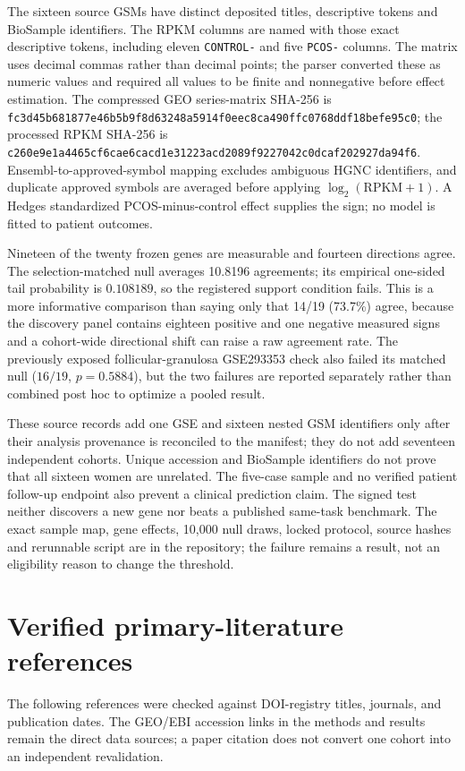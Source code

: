 \documentclass[11pt,a4paper]{article}
\begin{document}
The sixteen source GSMs have distinct deposited titles, descriptive tokens and BioSample identifiers. The RPKM columns are named with those exact descriptive tokens, including eleven \texttt{CONTROL-} and five \texttt{PCOS-} columns. The matrix uses decimal commas rather than decimal points; the parser converted these as numeric values and required all values to be finite and nonnegative before effect estimation. The compressed GEO series-matrix SHA-256 is \texttt{fc3d45b681877e46b5b9f8d63248a5914f0eec8ca490ffc0768ddf18befe95c0}; the processed RPKM SHA-256 is \texttt{c260e9e1a4465cf6cae6cacd1e31223acd2089f9227042c0dcaf202927da94f6}. Ensembl-to-approved-symbol mapping excludes ambiguous HGNC identifiers, and duplicate approved symbols are averaged before applying $\log_2(\mathrm{RPKM}+1)$. A Hedges standardized PCOS-minus-control effect supplies the sign; no model is fitted to patient outcomes.

Nineteen of the twenty frozen genes are measurable and fourteen directions agree. The selection-matched null averages 10.8196 agreements; its empirical one-sided tail probability is $0.108189$, so the registered support condition fails. This is a more informative comparison than saying only that 14/19 (73.7\%) agree, because the discovery panel contains eighteen positive and one negative measured signs and a cohort-wide directional shift can raise a raw agreement rate. The previously exposed follicular-granulosa GSE293353 check also failed its matched null ($16/19$, $p=0.5884$), but the two failures are reported separately rather than combined post hoc to optimize a pooled result.

These source records add one GSE and sixteen nested GSM identifiers only after their analysis provenance is reconciled to the manifest; they do not add seventeen independent cohorts. Unique accession and BioSample identifiers do not prove that all sixteen women are unrelated. The five-case sample and no verified patient follow-up endpoint also prevent a clinical prediction claim. The signed test neither discovers a new gene nor beats a published same-task benchmark. The exact sample map, gene effects, 10,000 null draws, locked protocol, source hashes and rerunnable script are in the repository; the failure remains a result, not an eligibility reason to change the threshold.

\section{Verified primary-literature references}
The following references were checked against DOI-registry titles, journals, and publication dates. The GEO/EBI accession links in the methods and results remain the direct data sources; a paper citation does not convert one cohort into an independent revalidation.

\end{document}
